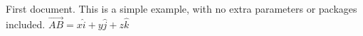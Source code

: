 \documentclass{article}
\begin{document}
First document. This is a simple example, with no 
extra parameters or packages included.
$ \vec{AB}=x\hat{i}+y\hat{j}+z\hat{k} $
\end{document}
